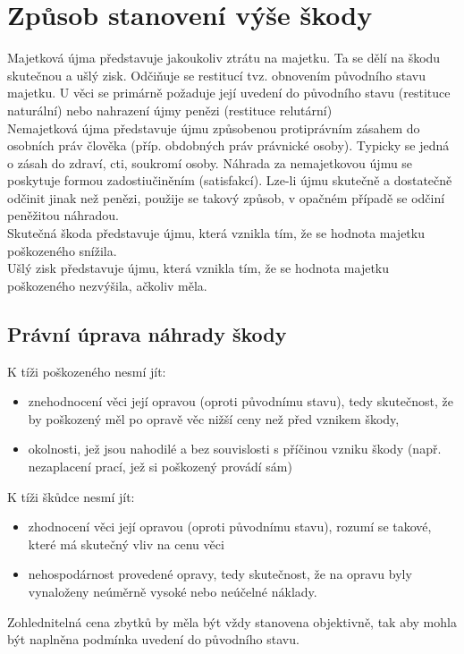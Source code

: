 \section{Způsob stanovení výše škody}
Majetková újma představuje jakoukoliv ztrátu na majetku. Ta se dělí na škodu skutečnou a ušlý zisk. Odčiňuje se restitucí tvz. obnovením původního stavu
majetku. U věci se primárně požaduje její uvedení do původního stavu (restituce naturální) nebo nahrazení újmy penězi (restituce relutární)\\
Nemajetková újma představuje újmu způsobenou protiprávním zásahem do osobních práv člověka (příp. obdobných práv právnické osoby). Typicky se jedná
o zásah do zdraví, cti, soukromí osoby. Náhrada za nemajetkovou újmu se poskytuje formou zadostiučiněním (satisfakcí). Lze-li újmu skutečně
a dostatečně odčinit jinak než penězi, použije se takový způsob, v opačném případě se odčiní peněžitou náhradou. \\
Skutečná škoda představuje újmu, která vznikla tím, že se hodnota majetku poškozeného snížila.\\
Ušlý zisk představuje újmu, která vznikla tím, že se hodnota majetku poškozeného nezvýšila, ačkoliv měla.\\
\subsection{Právní úprava náhrady škody}
K tíži poškozeného nesmí jít:
\begin{itemize}
    \item znehodnocení věci její opravou (oproti původnímu stavu), tedy skutečnost,
    že by poškozený měl po opravě věc nižší ceny než před vznikem škody,
    \item okolnosti, jež jsou nahodilé a bez souvislosti s příčinou vzniku škody (např.
    nezaplacení prací, jež si poškozený provádí sám)
\end{itemize}
K tíži škůdce nesmí jít:
\begin{itemize}
    \item zhodnocení věci její opravou (oproti původnímu stavu), rozumí se takové,
    které má skutečný vliv na cenu věci
    \item nehospodárnost provedené opravy, tedy skutečnost, že na opravu byly
    vynaloženy neúměrně vysoké nebo neúčelné náklady.
\end{itemize}
Zohlednitelná cena zbytků by měla být vždy stanovena objektivně, tak aby mohla být naplněna podmínka uvedení do původního stavu.

